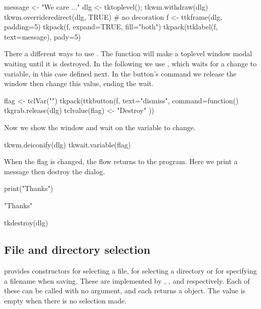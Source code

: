 \begin{Schunk}
\begin{Sinput}
 message <- "We care ..."
 dlg <- tktoplevel(); tkwm.withdraw(dlg)
 tkwm.overrideredirect(dlg, TRUE)   # no decoration
 f <- ttkframe(dlg, padding=5)
 tkpack(f, expand=TRUE, fill="both")
 tkpack(ttklabel(f, text=message), pady=5)
\end{Sinput}
\end{Schunk}

There a different ways to use . The function
 will make a toplevel window modal waiting until it is
destroyed. In the following we use , which
waits for a change to variable, in this case  defined
next. In the button's command we release the window then change this
value, ending the wait.
\begin{Schunk}
\begin{Sinput}
 flag <- tclVar("")
 tkpack(ttkbutton(f, text="dismiss", command=function() {
   tkgrab.release(dlg)
   tclvalue(flag) <- "Destroy"
 }))
\end{Sinput}
\end{Schunk}
Now we show the window and wait on the  variable to change.
\begin{Schunk}
\begin{Sinput}
 tkwm.deiconify(dlg)
 tkwait.variable(flag)
\end{Sinput}
\end{Schunk}

When the flag is changed, the flow returns to the program. Here we
print a message then destroy the dialog.
\begin{Schunk}
\begin{Sinput}
 print("Thanks")
\end{Sinput}
\begin{Soutput}
[1] "Thanks"
\end{Soutput}
\begin{Sinput}
 tkdestroy(dlg)
\end{Sinput}
\end{Schunk}


\subsection{File and directory selection}
\label{sec:file-direct-select}

\Tk\/ provides constructors for selecting a file, for selecting a
directory or for specifying a filename when saving. These are
implemented by ,
, and 
respectively. Each of these can be called with no argument, and
each returns a  object. The value is empty when there is no selection made.

